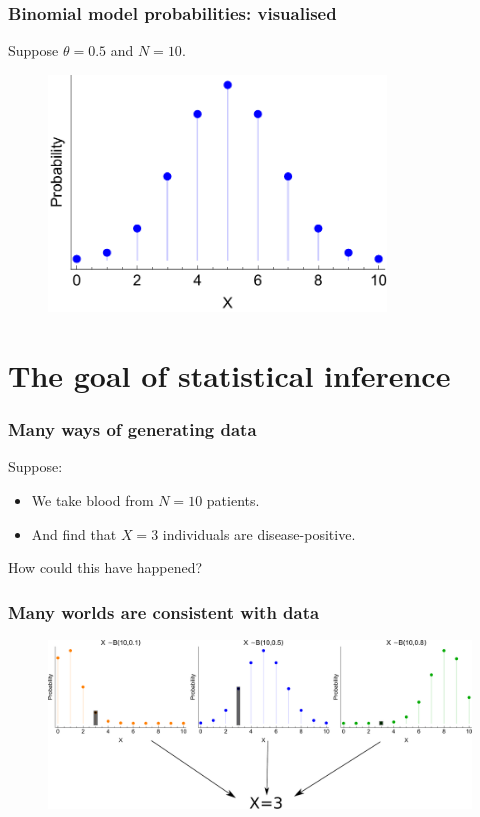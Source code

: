 \documentclass[handout]{beamer}
\begin{document}
\begin{frame}
	\frametitle{Binomial model probabilities: visualised}
	
	Suppose $\theta=0.5$ and $N=10$.
	
	\begin{figure}[h]
		\centerline{\includegraphics[width=0.8\textwidth]{figures/binomial.pdf}}
	\end{figure}
	
\end{frame}

\section{The goal of statistical inference}
\frame{\tableofcontents[currentsection]}


\begin{frame}
	\frametitle{Many ways of generating data}
	
	Suppose:
	
	\begin{itemize}
		\item We take blood from $N=10$ patients.
		\item And find that $X=3$ individuals are disease-positive.
	\end{itemize}
	
	How could this have happened?
	
\end{frame}

\begin{frame}
	\frametitle{Many worlds are consistent with data}
	
	\begin{figure}[h]
		\centerline{\includegraphics[width=1\textwidth]{figures/binomial_many_worlds_inkscaped.pdf}}
	\end{figure}
	
\end{frame}
\end{document}
